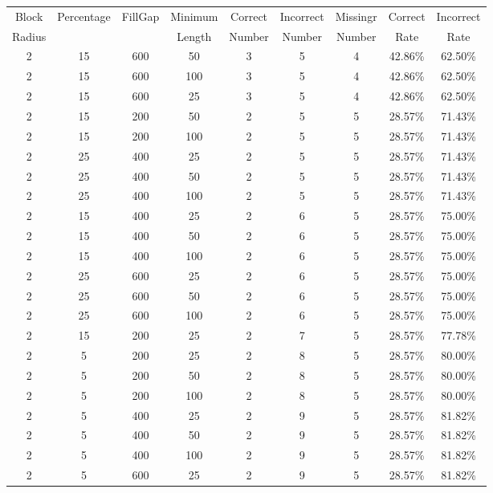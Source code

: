 \clearpage

\begingroup
\setlength{\LTleft}{-20cm plus -1fill}
\setlength{\LTright}{\LTleft}
{\small
\begin{longtable}{| c | c | c | c | c | c | c | c | c |} \hline
Block & Percentage & FillGap & Minimum & Correct & Incorrect & Missingr & Correct & Incorrect \\
Radius &  & & Length & Number & Number & Number & Rate & Rate \\ \hline
 2 & 15 & 600 & 50 & 3 & 5 & 4 & 42.86\% & 62.50\%   \\
 2 & 15 & 600 & 100 & 3 & 5 & 4 & 42.86\% & 62.50\%   \\
 2 & 15 & 600 & 25 & 3 & 5 & 4 & 42.86\% & 62.50\%   \\
 2 & 15 & 200 & 50 & 2 & 5 & 5 & 28.57\% & 71.43\%   \\
 2 & 15 & 200 & 100 & 2 & 5 & 5 & 28.57\% & 71.43\%   \\
 2 & 25 & 400 & 25 & 2 & 5 & 5 & 28.57\% & 71.43\%   \\
 2 & 25 & 400 & 50 & 2 & 5 & 5 & 28.57\% & 71.43\%   \\
 2 & 25 & 400 & 100 & 2 & 5 & 5 & 28.57\% & 71.43\%   \\
 2 & 15 & 400 & 25 & 2 & 6 & 5 & 28.57\% & 75.00\%   \\
 2 & 15 & 400 & 50 & 2 & 6 & 5 & 28.57\% & 75.00\%   \\
 2 & 15 & 400 & 100 & 2 & 6 & 5 & 28.57\% & 75.00\%   \\
 2 & 25 & 600 & 25 & 2 & 6 & 5 & 28.57\% & 75.00\%   \\
 2 & 25 & 600 & 50 & 2 & 6 & 5 & 28.57\% & 75.00\%   \\
 2 & 25 & 600 & 100 & 2 & 6 & 5 & 28.57\% & 75.00\%   \\
 2 & 15 & 200 & 25 & 2 & 7 & 5 & 28.57\% & 77.78\%   \\
 2 & 5 & 200 & 25 & 2 & 8 & 5 & 28.57\% & 80.00\%   \\
 2 & 5 & 200 & 50 & 2 & 8 & 5 & 28.57\% & 80.00\%   \\
 2 & 5 & 200 & 100 & 2 & 8 & 5 & 28.57\% & 80.00\%   \\
 2 & 5 & 400 & 25 & 2 & 9 & 5 & 28.57\% & 81.82\%   \\
 2 & 5 & 400 & 50 & 2 & 9 & 5 & 28.57\% & 81.82\%   \\
 2 & 5 & 400 & 100 & 2 & 9 & 5 & 28.57\% & 81.82\%   \\
 2 & 5 & 600 & 25 & 2 & 9 & 5 & 28.57\% & 81.82\%   \\

\end{longtable}}
